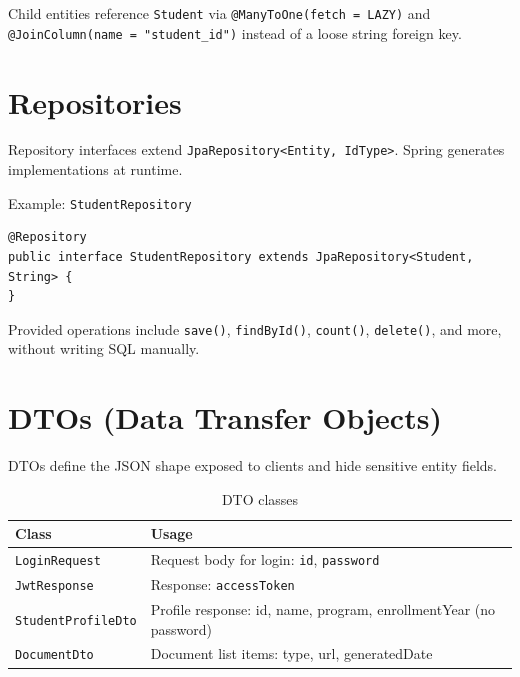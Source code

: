 \documentclass[11pt,a4paper]{article}
\begin{document}
Child entities reference \texttt{Student} via \texttt{@ManyToOne(fetch = LAZY)} and \texttt{@JoinColumn(name = "student\_id")} instead of a loose string foreign key.

\section{Repositories}

Repository interfaces extend \texttt{JpaRepository<Entity, IdType>}. Spring generates implementations at runtime.

Example: \texttt{StudentRepository}

\begin{lstlisting}[style=javacode, caption={StudentRepository}]
@Repository
public interface StudentRepository extends JpaRepository<Student, String> {
}
\end{lstlisting}

Provided operations include \texttt{save()}, \texttt{findById()}, \texttt{count()}, \texttt{delete()}, and more, without writing SQL manually.

\section{DTOs (Data Transfer Objects)}

DTOs define the JSON shape exposed to clients and hide sensitive entity fields.

\begin{table}[h]
\centering
\begin{tabular}{@{}lp{7.5cm}@{}}
\toprule
\textbf{Class} & \textbf{Usage} \\
\midrule
\texttt{LoginRequest}      & Request body for login: \texttt{id}, \texttt{password} \\
\texttt{JwtResponse}       & Response: \texttt{accessToken} \\
\texttt{StudentProfileDto} & Profile response: id, name, program, enrollmentYear (no password) \\
\texttt{DocumentDto}       & Document list items: type, url, generatedDate \\
\bottomrule
\end{tabular}
\caption{DTO classes}
\end{table}
\end{document}
